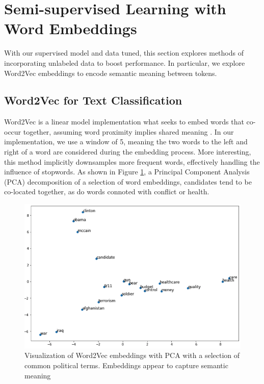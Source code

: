 \documentclass[11pt,a4paper]{article}
\begin{document}
\section{Semi-supervised Learning with Word Embeddings}%
\label{sec:semi_supervised_learning_with_word_embeddings}

With our supervised model and data tuned, this section explores methods of incorporating unlabeled data to boost performance. In particular, we explore Word2Vec 
embeddings to encode semantic meaning between tokens.
\subsection{Word2Vec for Text Classification}%
\label{sub:word2vec_for_text_classification}

Word2Vec \cite{mikolov2013distributed} is a linear model implementation what seeks to embed words that co-occur together, assuming word proximity implies shared meaning \cite{lilleberg2015support} . In our implementation, we use a window of 5, meaning the two words to the left and right of a word are considered during the embedding process. More interesting, this method implicitly downsamples more frequent words, effectively handling the influence of stopwords. As shown in Figure \ref{fig:imgs/w2v_pca}, a Principal Component Analysis (PCA) decomposition of a selection of word embeddings, candidates tend to be co-located together, as do words connoted with conflict or health. 


\begin{figure}[htpb]
  \centering
  \includegraphics[width=1\linewidth]{imgs/w2v_pca.png}
  \caption{Visualization of Word2Vec embeddings with PCA with a selection 
  of common political terms. Embeddings appear to capture semantic meaning}%
  \label{fig:imgs/w2v_pca}
\end{figure}
\end{document}
